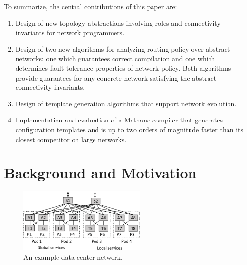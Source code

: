 \documentclass{sig-alternate-10pt}
\newcommand{\sysname}{{\small \sf Methane}\xspace}
\begin{document}
To summarize, the central contributions of this paper are:

\begin{enumerate}
\item Design of new topology abstractions involving roles and
connectivity invariants for network programmers.
\item Design of two new algorithms for analyzing routing policy over 
abstract networks: one which
guarantees correct compilation and one which determines fault tolerance 
properties of network policy.  Both algorithms provide guarantees for any 
concrete network satisfying the abstract connectivity invariants.
\item Design of template generation algorithms that support network
evolution.
\item Implementation and evaluation of a \sysname compiler that generates 
configuration templates and is up to two orders of magnitude faster 
than its closest competitor on large networks.
\end{enumerate}




%
%
%
%


\section{Background and Motivation}
\label{sec:motivation}

\begin{figure}[t!]
  \centering
  \includegraphics[width=2.5in]{figures/example}
  \caption{An example data center network.}
  \label{fig:example}
  \vspace{-1em}
\end{figure}
\end{document}
